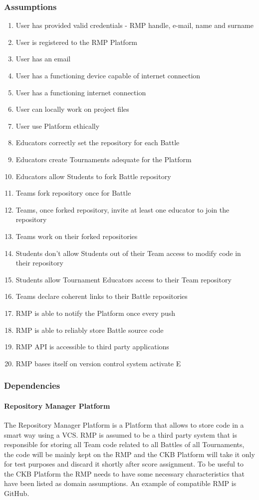 \subsubsection{Assumptions}
\begin{enumerate}[label=\textbf{D\arabic*:}]
    \item User has provided valid credentials - RMP handle, e-mail, name and surname
    \item User is registered to the RMP Platform
    \item User has an email
    \item User has a functioning device capable of internet connection
    \item User has a functioning internet connection
    \item User can locally work on project files
    \item User use Platform ethically
    \item Educators correctly set the repository for each Battle
    \item Educators create Tournaments adequate for the Platform
    \item Educators allow Students to fork Battle repository
    \item Teams fork repository once for Battle
    \item Teams, once forked repository, invite at least one educator to join the repository
    \item Teams work on their forked repositories
    \item Students don't allow Students out of their Team access to modify code in their repository
    \item Students allow Tournament Educators access to their Team repository
    \item Teams declare coherent links to their Battle repositories
    \item RMP is able to notify the Platform once every push
    \item RMP is able to reliably store Battle source code
    \item RMP API is accessible to third party applications
    \item RMP bases itself on version control system
    activate E\end{enumerate}
\subsubsection{Dependencies}
\paragraph{Repository Manager Platform}
The Repository Manager Platform is a Platform that allows to store code in a smart way using a VCS.
RMP is assumed to be a third party system that is responsible for storing all Team code related to all Battles of all Tournaments, the code will be mainly kept on the RMP and the CKB Platform will take it only for test purposes and discard it shortly after score assignment. 
To be useful to the CKB Platform the RMP needs to have some necessary characteristics that have been listed as domain assumptions.
An example of compatible RMP is GitHub.

